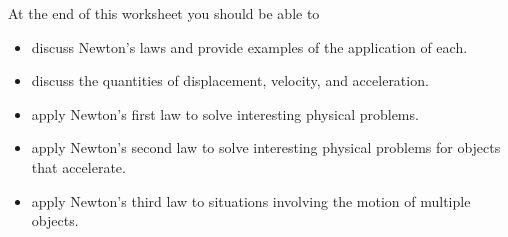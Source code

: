 At the end of this worksheet you should be able to  

\begin{itemize}
	\item discuss Newton's laws and provide examples of the application of each.
	\item discuss the quantities of displacement, velocity, and acceleration.
	\item apply Newton's first law to solve interesting physical problems.
	\item apply Newton's second law to solve interesting physical problems for objects that accelerate.
	\item apply Newton's third law to situations involving the motion of multiple objects. 


\end{itemize}


